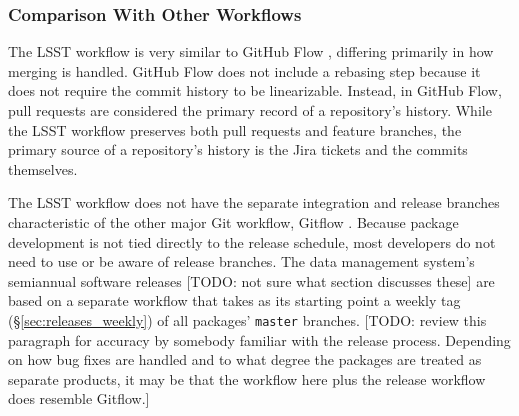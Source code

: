 \subsubsection{Comparison With Other Workflows}\label{sec:other_git_workflows}

The LSST workflow is very similar to GitHub Flow \cite{GitHubFlow}, differing primarily in how merging is handled.
GitHub Flow does not include a rebasing step because it does not require the commit history to be linearizable.
Instead, in GitHub Flow, pull requests are considered the primary record of a repository's history.
While the LSST workflow preserves both pull requests and feature branches, the primary source of a repository's history is the Jira tickets and the commits themselves.

The LSST workflow does not have the separate integration and release branches characteristic of the other major Git workflow, Gitflow \cite{Gitflow}.
Because package development is not tied directly to the release schedule, most developers do not need to use or be aware of release branches.
The data management system's semiannual software releases [TODO: not sure what section discusses these] are based on a separate workflow that takes as its starting point a weekly tag (\S\ref{sec:releases_weekly}) of all packages' \texttt{master} branches.
[TODO: review this paragraph for accuracy by somebody familiar with the release process. Depending on how bug fixes are handled and to what degree the packages are treated as separate products, it may be that the workflow here plus the release workflow does resemble Gitflow.]
